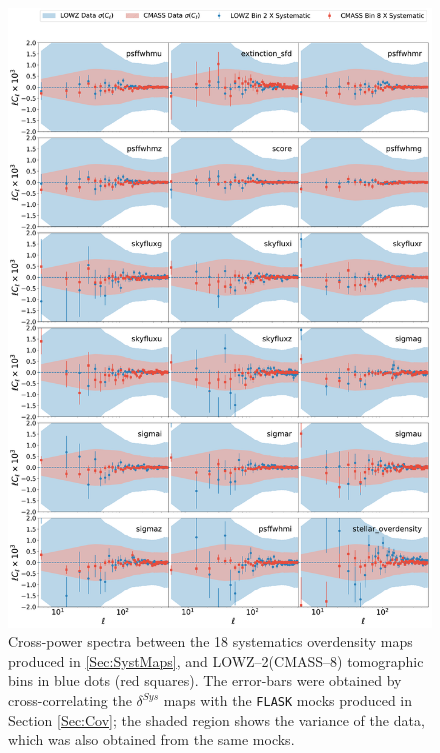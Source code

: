 \begin{figure}
\begin{center}
\includegraphics[width=\textwidth]{BOSS-FIGS/systematics_CMASS_Bin2_LOWZ_Bin2.pdf}
\caption[Cross-power spectra between systematics and LOWZ--2(CMASS--8) tomographic bins.]{Cross-power spectra between the 18 systematics overdensity maps produced in \ref{Sec:SystMaps}, and LOWZ--2(CMASS--8) tomographic bins in blue dots (red squares). The error-bars were obtained by cross-correlating the $\delta^{Sys}$ maps with the \texttt{FLASK} mocks produced in Section \ref{Sec:Cov}; the shaded region shows the variance of the data, which was also obtained from the same mocks.}
\label{fig:SystBin2}
\end{center}
\end{figure}

